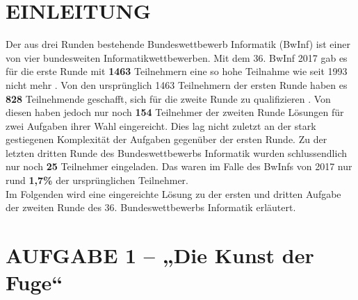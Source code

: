 \documentclass[a4paper,12pt]{article}
\begin{document}

\newpage

\thispagestyle{empty}
\tableofcontents	
\thispagestyle{empty}




\newpage
\setcounter{page}{3}
\section{EINLEITUNG}



Der aus drei Runden bestehende Bundeswettbewerb Informatik (BwInf) ist einer von vier bundesweiten Informatikwettbewerben. Mit dem 36. BwInf 2017 gab es für die erste Runde mit \textbf{1463} Teilnehmern eine so hohe Teilnahme wie seit 1993 nicht mehr \cite{bwinf_runde1_ergebnis}. Von den ursprünglich 1463 Teilnehmern der ersten Runde haben es \textbf{828} Teilnehmende geschafft, sich für die zweite Runde zu qualifizieren \cite{bwinf_runde2_ergebnis}. Von diesen haben jedoch nur noch \textbf{154} Teilnehmer der zweiten Runde Lösungen für zwei Aufgaben ihrer Wahl eingereicht. Dies lag nicht zuletzt an der stark gestiegenen Komplexität der Aufgaben gegenüber der ersten Runde. Zu der letzten dritten Runde des Bundeswettbewerbs Informatik wurden schlussendlich nur noch \textbf{25} Teilnehmer eingeladen. Das waren im Falle des BwInfs von 2017 nur rund \textbf{1,7\%} der ursprünglichen Teilnehmer.
\\[0.4cm]
Im Folgenden wird eine eingereichte Lösung zu der ersten und dritten Aufgabe der zweiten Runde des 36. Bundeswettbewerbs Informatik erläutert.


\newpage
\section{AUFGABE 1 – „Die Kunst der Fuge“}
\end{document}
